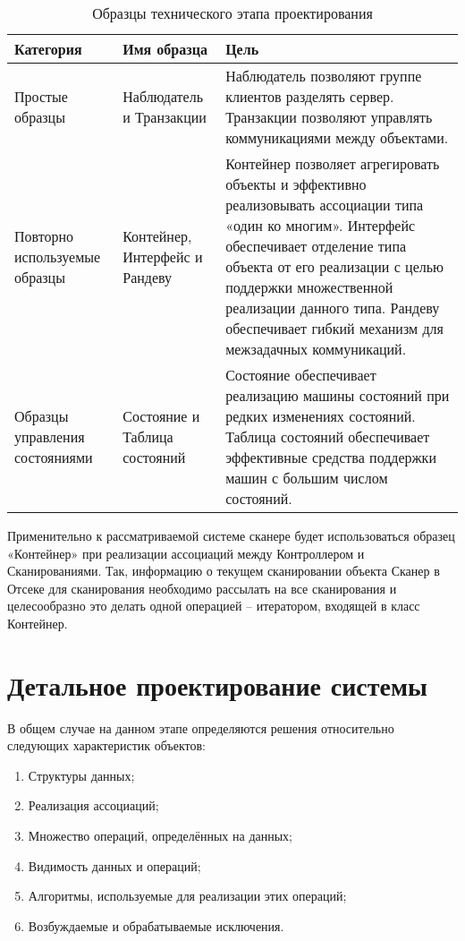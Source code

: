 \documentclass[12pt]{article}
\let\oldsection\section
\renewcommand{\section}[1]{
    \oldsection{#1}
    \setcounter{table}{0}
    \setcounter{figure}{0}
}
\begin{document}
    \begin{table}[h!]
        \centering
        \begin{tabulary}{\textwidth}{|L|L|L|}
            \hline
            Категория & Имя образца & Цель \\
            \hline
            Простые образцы  & Наблюдатель и Транзакции  & Наблюдатель позволяют группе клиентов разделять сервер. Транзакции позволяют управлять коммуникациями между объектами. \\
            \hline
            Повторно используемые образцы  & Контейнер, Интерфейс и Рандеву  & Контейнер позволяет агрегировать объекты и эффективно реализовывать ассоциации типа «один ко многим». Интерфейс обеспечивает отделение типа объекта от его реализации с целью поддержки множественной реализации данного типа. Рандеву обеспечивает гибкий механизм для межзадачных коммуникаций.\\
            \hline
            Образцы управления состояниями  & Состояние и Таблица состояний  & Состояние обеспечивает реализацию машины состояний при редких изменениях состояний. Таблица состояний обеспечивает эффективные средства поддержки машин с большим числом состояний. \\
            \hline
        \end{tabulary}
        \caption{Образцы технического этапа проектирования}
    \end{table}

    Применительно к рассматриваемой системе сканере будет использоваться образец «Контейнер» при реализации ассоциаций между Контроллером и Сканированиями. Так, информацию о текущем сканировании объекта Сканер в Отсеке для сканирования необходимо рассылать на все сканирования и целесообразно это делать одной операцией – итератором, входящей в класс Контейнер.

    \newpage

    \section{Детальное проектирование системы}

    В общем случае на данном этапе определяются решения относительно следующих характеристик объектов:

    \begin{enumerate}
        \item Структуры данных;
        \item Реализация ассоциаций;
        \item Множество операций, определённых на данных;
        \item Видимость данных и операций;
        \item Алгоритмы, используемые для реализации этих операций;
        \item Возбуждаемые и обрабатываемые исключения.
    \end{enumerate}
\end{document}
